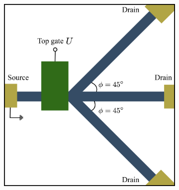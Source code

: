     \begin{figure}[H] 
        \centering
        \begin{subfigure}[b]{0.45\linewidth}
            \includegraphics[width=\linewidth]{fig/3 arm structure.png}
            \caption{}
            \label{fig:3 arms}
        \end{subfigure}
        \begin{subfigure}[b]{0.3\linewidth}

\end{subfigure}
\end{figure}
